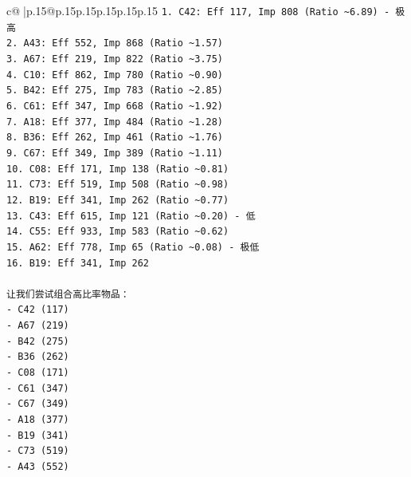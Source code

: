 \documentclass{article}
\begin{document}
{\begin{supertabular}{c@{$\;$}|p{.15\linewidth}@{}p{.15\linewidth}p{.15\linewidth}p{.15\linewidth}p{.15\linewidth}p{.15\linewidth}}
{{{\texttt{1. C42: Eff 117, Imp 808 (Ratio \textasciitilde{}6.89) {-} 极高} \\
\texttt{2. A43: Eff 552, Imp 868 (Ratio \textasciitilde{}1.57)} \\
\texttt{3. A67: Eff 219, Imp 822 (Ratio \textasciitilde{}3.75)} \\
\texttt{4. C10: Eff 862, Imp 780 (Ratio \textasciitilde{}0.90)} \\
\texttt{5. B42: Eff 275, Imp 783 (Ratio \textasciitilde{}2.85)} \\
\texttt{6. C61: Eff 347, Imp 668 (Ratio \textasciitilde{}1.92)} \\
\texttt{7. A18: Eff 377, Imp 484 (Ratio \textasciitilde{}1.28)} \\
\texttt{8. B36: Eff 262, Imp 461 (Ratio \textasciitilde{}1.76)} \\
\texttt{9. C67: Eff 349, Imp 389 (Ratio \textasciitilde{}1.11)} \\
\texttt{10. C08: Eff 171, Imp 138 (Ratio \textasciitilde{}0.81)} \\
\texttt{11. C73: Eff 519, Imp 508 (Ratio \textasciitilde{}0.98)} \\
\texttt{12. B19: Eff 341, Imp 262 (Ratio \textasciitilde{}0.77)} \\
\texttt{13. C43: Eff 615, Imp 121 (Ratio \textasciitilde{}0.20) {-} 低} \\
\texttt{14. C55: Eff 933, Imp 583 (Ratio \textasciitilde{}0.62)} \\
\texttt{15. A62: Eff 778, Imp 65 (Ratio \textasciitilde{}0.08) {-} 极低} \\
\texttt{16. B19: Eff 341, Imp 262} \\
\\ 
\texttt{让我们尝试组合高比率物品：} \\
\texttt{{-} C42 (117)} \\
\texttt{{-} A67 (219)} \\
\texttt{{-} B42 (275)} \\
\texttt{{-} B36 (262)} \\
\texttt{{-} C08 (171)} \\
\texttt{{-} C61 (347)} \\
\texttt{{-} C67 (349)} \\
\texttt{{-} A18 (377)} \\
\texttt{{-} B19 (341)} \\
\texttt{{-} C73 (519)} \\
\texttt{{-} A43 (552)} \\
\\ 
}}}
\end{supertabular}}
\end{document}
